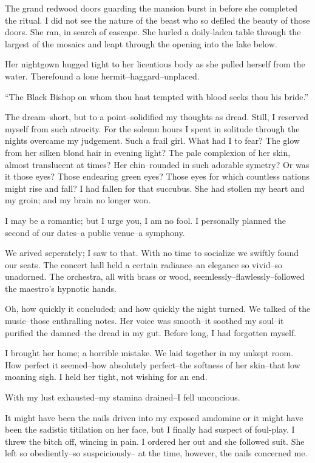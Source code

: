 \documentclass{article}
\begin{document}
\noindent %
The grand redwood doors guarding the mansion burst in
before she completed the ritual.
I did not see the nature of the beast who so defiled the
beauty of those doors.
She ran, in search of eascape.
She hurled a doily-laden table through the largest
of the mosaics and leapt through the opening
into the lake below.


Her nightgown hugged tight to her licentious body
as she pulled herself from the water.
Therefound a lone hermit--haggard--unplaced.


``The Black Bishop on whom thou hast tempted
with blood seeks thou his bride.''
\VV


\noindent
The dream--short, but to a point--solidified my thoughts as dread.
Still, I reserved myself from such atrocity.
For the solemn hours I spent in solitude through the nights
overcame my judgement.
Such a frail girl.
What had I to fear?
The glow from her silken blond hair in evening light?
The pale complexion of her skin, almost translucent at times?
Her chin--rounded in such adorable symetry?
Or was it those eyes? Those endearing green eyes?
Those eyes for which countless nations might rise and fall?
I had fallen for that succubus.
She had stollen my heart and my groin;
and my brain no longer won.
\VV


\noindent
I may be a romantic; but I urge you, I am no fool.
I personally planned the second of our dates--a public venue--a symphony.


We arived seperately; I saw to that.
With no time to socialize we swiftly found our seats.
The concert hall held a certain radiance--an elegance
so vivid--so unadorned.
The orchestra, all with brass or wood, seemlessly--flawlessly--followed
the maestro's hypnotic hands.


Oh, how quickly it concluded; and how quickly the night turned.
We talked of the music--those enthralling notes.
Her voice was smooth--it soothed my soul--it purified
the damned--the dread in my gut.
Before long, I had forgotten myself.


I brought her home; a horrible mistake.
We laid together in my unkept room.
How perfect it seemed--how
absolutely perfect--the
softness of her skin--that
low moaning sigh.
I held her tight, not wishing for an end.
\VV


\noindent
With my lust exhausted--my stamina drained--I fell unconcious.
\VV


\noindent
It might have been the nails driven into my exposed amdomine
or it might have been the sadistic titilation on her face,
but I finally had suspect of foul-play.
I threw the bitch off, wincing in pain.
I ordered her out and she followed suit.
She left so obediently--so suspciciously--
at the time, however, the nails concerned me.
\end{document}
